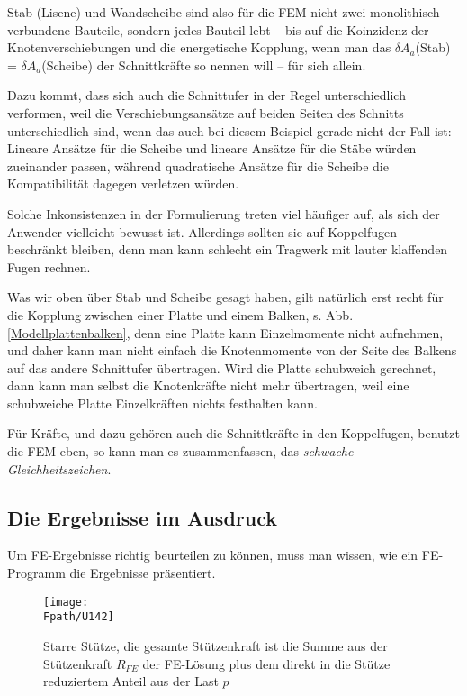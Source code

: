Stab (Lisene) und Wandscheibe sind also f\"{u}r die FEM nicht zwei monolithisch verbundene Bauteile, sondern jedes Bauteil lebt -- bis auf die Koinzidenz der Knotenverschiebungen und die energetische Kopplung, wenn man das $\delta A_a$(Stab) = $\delta A_a$(Scheibe) der Schnittkr\"{a}fte so nennen will -- f\"{u}r  sich allein.

Dazu kommt, dass sich auch die Schnittufer in der Regel unterschiedlich verformen, weil die Verschiebungsans\"{a}tze auf beiden Seiten des Schnitts unterschiedlich sind, wenn das auch bei diesem Beispiel gerade nicht der Fall ist: Lineare Ans\"{a}tze f\"{u}r die Scheibe und lineare Ans\"{a}tze f\"{u}r die St\"{a}be w\"{u}rden zueinander passen, w\"{a}hrend quadratische Ans\"{a}tze f\"{u}r die Scheibe die Kompatibilit\"{a}t dagegen verletzen w\"{u}rden.

Solche Inkonsistenzen in der Formulierung treten viel h\"{a}ufiger auf, als sich der Anwender vielleicht bewusst ist. Allerdings sollten sie auf Koppelfugen beschr\"{a}nkt bleiben, denn man kann schlecht ein Tragwerk mit lauter klaffenden Fugen rechnen.

Was wir oben \"{u}ber Stab und Scheibe gesagt haben, gilt nat\"{u}rlich erst recht f\"{u}r die Kopplung zwischen einer Platte und einem Balken, s. Abb. \ref{Modellplattenbalken}, denn eine Platte kann Einzelmomente nicht aufnehmen, und daher kann man nicht einfach die Knotenmomente von der Seite des Balkens auf das andere Schnittufer \"{u}bertragen. Wird die Platte schubweich gerechnet, dann kann man selbst die Knotenkr\"{a}fte nicht mehr \"{u}bertragen, weil eine schubweiche Platte Einzelkr\"{a}ften nichts festhalten kann.

F\"{u}r Kr\"{a}fte, und dazu geh\"{o}ren auch die Schnittkr\"{a}fte in den Koppelfugen, benutzt die FEM eben, so kann man es zusammenfassen, das {\em schwache Gleichheitszeichen\/}.
\vspace{-0.5cm}
{\textcolor{sectionTitleBlue}{\section{Die Ergebnisse im Ausdruck}}}\label{Ausdruck}
Um FE-Ergebnisse richtig beurteilen zu k\"{o}nnen, muss man wissen, wie ein FE-Programm die
Ergebnisse pr\"{a}sentiert.
\begin{figure}[tbp]
\centering
\texttt{[image: \\Fpath/U142]}
\caption{Starre St\"{u}tze, die gesamte St\"{u}tzenkraft ist die Summe aus der St\"{u}tzenkraft $R_{FE}$ der FE-L\"{o}sung plus dem direkt in die St\"{u}tze reduziertem Anteil aus der Last $p$} \label{U142}
\end{figure}%

